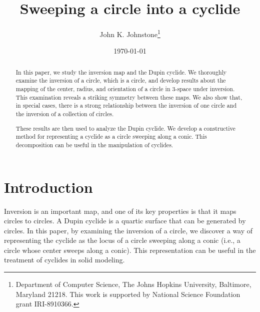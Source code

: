 \newif\ifFull
\Fullfalse
{} 



\newtheorem{defn2}{Definition}



\title{Sweeping a circle into a cyclide}
\author{John K. Johnstone\thanks{Department of Computer Science, The Johns 
	Hopkins University, Baltimore, Maryland 21218.
	This work is supported by National Science Foundation grant
	IRI-8910366.}}
\date{\today}

\maketitle


\SingleSpace


\begin{abstract}
In this paper, we study the inversion map and the Dupin cyclide.
We thoroughly examine the inversion of a circle, which is a circle,
and develop results about the mapping of 
the center, radius, and orientation of a circle in 3-space
under inversion.
This examination reveals a striking symmetry between these maps.
We also show that, in special cases, there is a strong relationship
between the inversion of one circle and the inversion of a collection
of circles.

These results are then used to analyze the Dupin cyclide.
We develop a constructive method for representing
a cyclide as a circle sweeping along a conic.
This decomposition can be useful in the manipulation of cyclides.
\end{abstract}


\section{Introduction}

Inversion is an important map, and one of its key properties is that it
maps circles to circles.
A Dupin cyclide is a quartic surface that can be generated by circles.
In this paper, by examining the inversion of a circle, we discover
a way of representing the cyclide as the locus of 
a circle sweeping along a conic
(i.e., a circle whose center sweeps along a conic).
This representation can be useful in the treatment
of cyclides in solid modeling.

